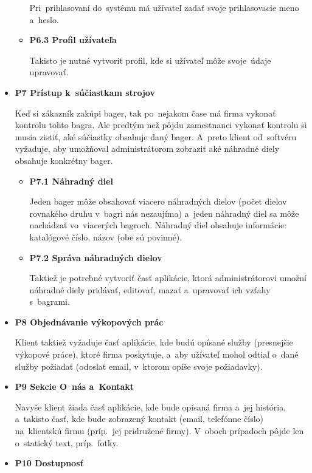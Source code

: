 \begin{itemize}
\begin{itemize}
Pri~prihlasovaní do~systému má užívateľ zadať svoje prihlasovacie meno a~heslo.

\item \textbf{P6.3 Profil užívateľa}

Takisto je nutné vytvoriť profil, kde si užívateľ môže svoje~údaje upravovať.
\end{itemize}

\item \textbf{P7 Prístup k~súčiastkam strojov}

Keď si zákazník zakúpi bager, tak po~nejakom čase má firma vykonať kontrolu tohto bagra. Ale predtým než pôjdu zamestnanci vykonať kontrolu si musia zistiť, aké súčiastky obsahuje daný bager. A~preto klient od~softvéru vyžaduje, aby umožňoval administrátorom zobraziť aké náhradné diely obsahuje konkrétny bager.

\begin{itemize}
\item \textbf{P7.1 Náhradný diel}

Jeden bager môže obsahovať viacero náhradných dielov (počet dielov rovnakého druhu v~bagri nás nezaujíma) a~jeden náhradný diel sa môže nachádzať vo~viacerých bagroch. Náhradný diel obsahuje informácie: katalógové číslo, názov (obe sú povinné).

\item \textbf{P7.2 Správa náhradných dielov}

Taktiež je potrebné vytvoriť časť aplikácie, ktorá administrátorovi umožní náhradné diely pridávať, editovať, mazať a~upravovať ich vzťa\-hy s~bagrami.
\end{itemize}

\item \textbf{P8 Objednávanie výkopových prác}

Klient taktiež vyžaduje časť aplikácie, kde budú opísané služby (presnejšie výkopové práce), ktoré firma poskytuje, a~aby užívateľ mohol odtiaľ o~dané služby požiadať (odoslať email, v~ktorom opíše svoje požiadavky).

\item \textbf{P9 Sekcie O~nás a~Kontakt}

Navyše klient žiada časť aplikácie, kde bude opísaná firma a~jej história, a~takisto časť, kde bude zobrazený kontakt (email, telefónne číslo) na~klientskú firmu (príp.~jej pridružené firmy). V~oboch prípadoch pôjde len o~statický text, príp.~fotky.

\item \textbf{P10 Dostupnosť}
\label{dostupnost}


\end{itemize}
